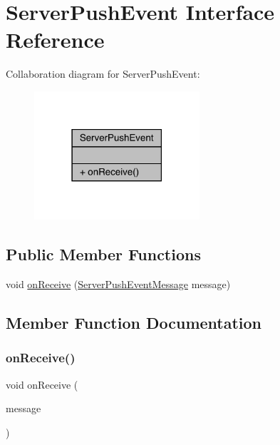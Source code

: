 \hypertarget{interfacecom_1_1toast_1_1android_1_1gamebase_1_1serverpush_1_1_server_push_event}{}\section{Server\+Push\+Event Interface Reference}
\label{interfacecom_1_1toast_1_1android_1_1gamebase_1_1serverpush_1_1_server_push_event}


Collaboration diagram for Server\+Push\+Event\+:\nopagebreak
\begin{figure}[H]
\begin{center}
\leavevmode
\includegraphics[width=174pt]{interfacecom_1_1toast_1_1android_1_1gamebase_1_1serverpush_1_1_server_push_event__coll__graph}
\end{center}
\end{figure}
\subsection*{Public Member Functions}
\begin{DoxyCompactItemize}
\item 
void \hyperlink{interfacecom_1_1toast_1_1android_1_1gamebase_1_1serverpush_1_1_server_push_event_af7ad07c3768225f8107d20baa1ee7174}{on\+Receive} (\hyperlink{classcom_1_1toast_1_1android_1_1gamebase_1_1serverpush_1_1_server_push_event_message}{Server\+Push\+Event\+Message} message)
\end{DoxyCompactItemize}


\subsection{Member Function Documentation}
\mbox{\label{interfacecom_1_1toast_1_1android_1_1gamebase_1_1serverpush_1_1_server_push_event_af7ad07c3768225f8107d20baa1ee7174}} 
\subsubsection{\texorpdfstring{on\+Receive()}{onReceive()}}
{\footnotesize\ttfamily void on\+Receive (\begin{DoxyParamCaption}\item[{\hyperlink{classcom_1_1toast_1_1android_1_1gamebase_1_1serverpush_1_1_server_push_event_message}{Server\+Push\+Event\+Message}}]{message }\end{DoxyParamCaption})}

